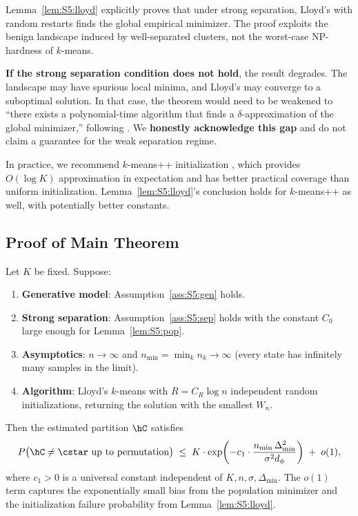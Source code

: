 \begin{remark}
\label{rem:S5:npgap}
Lemma~\ref{lem:S5:lloyd} explicitly proves that under strong separation,
Lloyd's with random restarts finds the global empirical minimizer.
The proof exploits the benign landscape induced by well-separated
clusters, not the worst-case NP-hardness of $k$-means.

\textbf{If the strong separation condition does not hold}, the result
degrades.  The landscape may have spurious local minima, and Lloyd's may
converge to a suboptimal solution.  In that case, the theorem would need
to be weakened to ``there exists a polynomial-time algorithm that finds
a $\delta$-approximation of the global minimizer,'' following
\cite{kumar2010clustering,ostrovsky2013effectiveness}.  We
\textbf{honestly acknowledge this gap} and do not claim a guarantee for
the weak separation regime.

In practice, we recommend $k$-means++ initialization
\cite{arthur2007kmeanspp}, which provides $O(\log K)$ approximation in
expectation and has better practical coverage than uniform initialization.
Lemma~\ref{lem:S5:lloyd}'s conclusion holds for $k$-means++ as well,
with potentially better constants.
\end{remark}

\subsection{Proof of Main Theorem}
\label{sec:S5:main}

\begin{theorem}
\label{thm:S5:main}
Let $K$ be fixed.  Suppose:
\begin{enumerate}
\item \textbf{Generative model}: Assumption~\ref{ass:S5:gen} holds.
\item \textbf{Strong separation}: Assumption~\ref{ass:S5:sep} holds with
the constant $C_0$ large enough for Lemma~\ref{lem:S5:pop}.
\item \textbf{Asymptotics}: $n\to\infty$ and
$n_{\min}=\min_k n_k\to\infty$ (every state has infinitely many samples
in the limit).
\item \textbf{Algorithm}: Lloyd's $k$-means with
$R=C_R\log n$ independent random initializations, returning the solution
with the smallest $W_n$.
\end{enumerate}
Then the estimated partition $\hC$ satisfies
\begin{equation}
P\bigl(\hC\neq\cstar\text{ up to permutation}\bigr)
\;\le\; K\cdot\exp\!\left(
          -c_1\cdot\frac{n_{\min}\,\Delta_{\min}^2}{\sigma^2 d_\phi}\right)
        \;+\; o(1),
\label{eq:S5:main}
\end{equation}
where $c_1>0$ is a universal constant independent of
$K,n,\sigma,\Delta_{\min}$.  The $o(1)$ term captures the exponentially
small bias from the population minimizer and the initialization failure
probability from Lemma~\ref{lem:S5:lloyd}.
\end{theorem}

